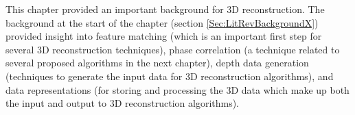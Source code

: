 
This chapter provided an important background for 3D reconstruction. The background at the start of the chapter (section \ref{Sec:LitRevBackgroundX}) provided insight into feature matching (which is an important first step for several 3D reconstruction techniques), phase correlation (a technique related to several proposed algorithms in the next chapter), depth data generation (techniques to generate the input data for 3D reconstruction algorithms), and data representations (for storing and processing the 3D data which make up both the input and output to 3D reconstruction algorithms). \\


\begin{table}[!t]
\centering
\caption{Literature Algorithm Comparison}
\label{tab:litRev_Alg_Comp}
\end{table}


